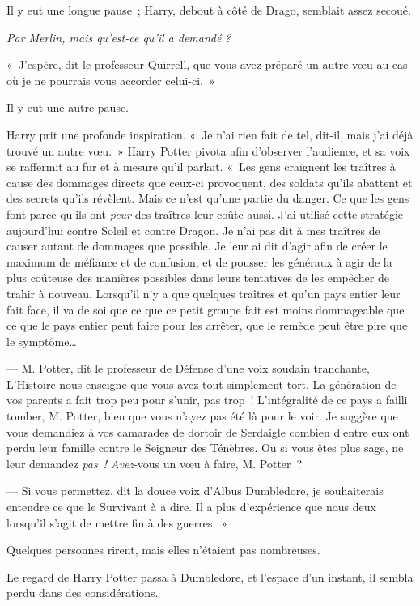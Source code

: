Il y eut une longue pause~; Harry, debout à côté de Drago, semblait assez secoué.

\emph{Par Merlin, mais qu'est-ce qu'il a demandé} \emph{?}

«~J'espère, dit le professeur Quirrell, que vous avez préparé un autre vœu au cas où je ne pourrais vous accorder celui-ci.~»

Il y eut une autre pause.

Harry prit une profonde inspiration. «~Je n'ai rien fait de tel, dit-il, mais j'ai déjà trouvé un autre vœu.~» Harry Potter pivota afin d'observer l'audience, et sa voix se raffermit au fur et à mesure qu'il parlait. «~Les gens craignent les traîtres à cause des dommages directs que ceux-ci provoquent, des soldats qu'ils abattent et des secrets qu'ils révèlent. Mais ce n'est qu'une partie du danger. Ce que les gens font parce qu'ils ont \emph{peur} des traîtres leur coûte aussi. J'ai utilisé cette stratégie aujourd'hui contre Soleil et contre Dragon. Je n'ai pas dit à mes traîtres de causer autant de dommages que possible. Je leur ai dit d'agir afin de créer le maximum de méfiance et de confusion, et de pousser les généraux à agir de la plus coûteuse des manières possibles dans leurs tentatives de les empêcher de trahir à nouveau. Lorsqu'il n'y a que quelques traîtres et qu'un pays entier leur fait face, il va de soi que ce que ce petit groupe fait est moins dommageable que ce que le pays entier peut faire pour les arrêter, que le remède peut être pire que le symptôme…

--- M. Potter, dit le professeur de Défense d'une voix soudain tranchante, L'Histoire nous enseigne que vous avez tout simplement tort. La génération de vos parents a fait trop peu pour s'unir, pas trop~! L'intégralité de ce pays a failli tomber, M. Potter, bien que vous n'ayez pas été là pour le voir. Je suggère que vous demandiez à vos camarades de dortoir de Serdaigle combien d'entre eux ont perdu leur famille contre le Seigneur des Ténèbres. Ou si vous êtes plus sage, ne leur demandez \emph{pas~!} \emph{Avez}-vous un vœu à faire, M. Potter~?

--- Si vous permettez, dit la douce voix d'Albus Dumbledore, je souhaiterais entendre ce que le Survivant à a dire. Il a plus d'expérience que nous deux lorsqu'il s'agit de mettre fin à des guerres.~»

Quelques personnes rirent, mais elles n'étaient pas nombreuses.

Le regard de Harry Potter passa à Dumbledore, et l'espace d'un instant, il sembla perdu dans des considérations.

